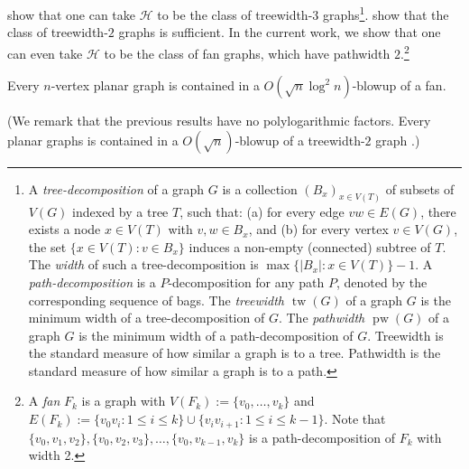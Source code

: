 \documentclass{patmorin}
\renewcommand{\leq}{\leqslant}
\newcommand{\defin}[1]{\emph{\textcolor{brightmaroon}{#1}}}
\DeclareMathOperator{\tw}{tw}
\DeclareMathOperator{\pw}{pw}
\begin{document}
\citet{ISW} show that one can take $\mathcal{H}$ to be the class of treewidth-$3$ graphs\footnote{A \defin{tree-decomposition} of a graph $G$ is a collection $(B_x)_{x \in V(T)}$ of subsets of $V(G)$ indexed by a tree $T$, such that: (a) for every edge ${vw \in E(G)}$, there exists a node ${x \in V(T)}$ with ${v,w \in B_x}$, and (b) for every vertex ${v \in V(G)}$, the set $\{ x \in V(T) \colon v \in B_x \}$ induces a non-empty (connected) subtree of $T$. The \defin{width} of such a tree-decomposition is ${\max\{ |B_x| \colon x \in V(T) \}-1}$. A \defin{path-decomposition} is a $P$-decomposition for any path $P$, denoted by the corresponding sequence of bags.
The \defin{treewidth $\tw(G)$} of a graph $G$ is the minimum width of a tree-decomposition of $G$.
The \defin{pathwidth $\pw(G)$} of a graph $G$ is the minimum width of a path-decomposition of $G$.
Treewidth is the standard measure of how similar a graph is to a tree.
Pathwidth is the standard measure of how similar a graph is to a path.}. \citet{distel.dujmovic.ea:product} show that the class of treewidth-$2$ graphs is sufficient.  In the current work, we show that one can even take $\mathcal{H}$ to be the class of fan graphs, which have pathwidth $2$.\footnote{A \defin{fan} $F_k$ is a graph with $V(F_k):=\{v_0,\ldots,v_k\}$ and $E(F_k):=\{v_0v_i:1\leq i\leq k\}\cup\{v_iv_{i+1}:1\leq i\leq k-1\}$. Note that $\{v_0,v_1,v_2\},\{v_0,v_2,v_3\},\dots,\{v_0,v_{k-1},v_k\}$ is a path-decomposition of $F_k$ with width 2.}

\begin{thm}\label{main_thm_planar}
  Every $n$-vertex planar graph is contained in a $O(\sqrt{n}\log^2 n)$-blowup of a fan.
\end{thm}

(We remark that the previous results \cite{ISW,distel.dujmovic.ea:product} have no polylogarithmic factors.  Every planar graphs is contained in a $O(\sqrt{n})$-blowup of a treewidth-$2$ graph \cite{distel.dujmovic.ea:product}.)
\end{document}
